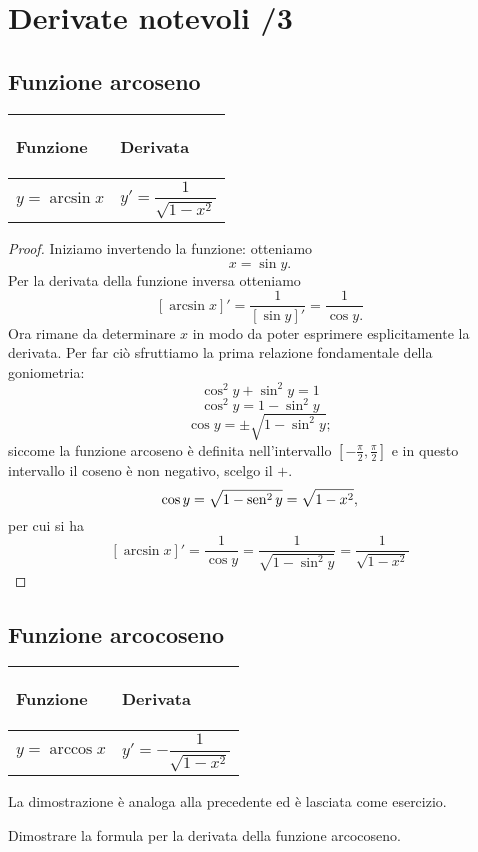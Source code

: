 \section{Derivate notevoli /3}
\subsection{Funzione arcoseno}
\begin{center}
    \begin{tabular}{m{}|m{}}
        \begin{center}
            \textbf{Funzione}
        \end{center}
        & 
        \begin{center}
            \textbf{Derivata}
        \end{center}\\
        \hline
            \[y=\arcsin x\] &
            \[y'=\frac{1}{\sqrt{1-x^2}}\]
    \end{tabular}
\end{center}
    \begin{proof}
        Iniziamo invertendo la funzione: otteniamo 
        \[x=\sin y.\]
        Per la derivata della funzione inversa otteniamo
        \[\left[ \arcsin x \right]'=\frac{1}{\left[ \sin y \right]'}=\frac{1}{\cos y.}\]
        Ora rimane da determinare $x$ in modo da poter esprimere esplicitamente la derivata. Per far ciò sfruttiamo la prima relazione fondamentale della goniometria:
        \[\cos^2y+\sin ^2y=1\]
        \[\cos^2y=1-\sin^2y\]
        \[\cos y=\pm\sqrt{1-\sin^2y};\]
        siccome la funzione arcoseno è definita nell'intervallo $\left[ -\frac{\pi}{2}, \frac{\pi}{2} \right]$ e in questo intervallo il coseno è non negativo, scelgo il $+$.
        \[\cos y = \sqrt{1-\operatorname{sen}^2y}=\sqrt{1-x^2},\]
        per cui si ha
        \[\left[ \arcsin x \right]' = \frac{1}{\cos y}= \frac{1}{\sqrt{1-\sin^2 y}}=\frac{1}{\sqrt{1-x^2}}\]
    \end{proof}
\subsection{Funzione arcocoseno}
\begin{center}
    \begin{tabular}{m{}|m{}}
        \begin{center}
            \textbf{Funzione}
        \end{center}
        & 
        \begin{center}
            \textbf{Derivata}
        \end{center}\\
        \hline
            \[y=\arccos x\] &
            \[y'=-\frac{1}{\sqrt{1-x^2}}\]
    \end{tabular}
\end{center}
La dimostrazione è analoga alla precedente ed è lasciata come esercizio.
\begin{exc}\label{exc: derivata arccos}
    Dimostrare la formula per la derivata della funzione arcocoseno. 
\end{exc}

